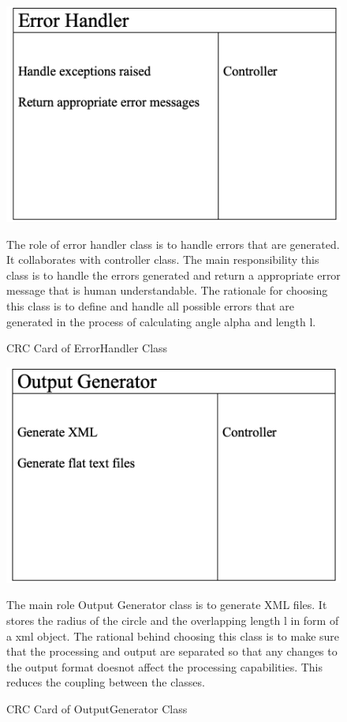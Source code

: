   \begin{figure}
    \centering
    \includegraphics[width=.5\linewidth]{resources/ErrorHandler.png}
    \caption{CRC Card of ErrorHandler Class}\label{fig:error}

    \parbox{1.0\linewidth}{
      The role of error handler class is to handle errors that are generated. It collaborates with controller class. The main responsibility this class is to handle the errors generated and return a appropriate error message that is human understandable. The rationale for choosing this class is to define and handle all possible errors that are generated in the process of calculating angle alpha and length l.
      }

  \end{figure}
  \begin{figure}[h]
    \centering
    \includegraphics[width=.5\linewidth]{resources/OutputGenerator.png}
    \caption{CRC Card of OutputGenerator Class}\label{fig:output}
    \parbox{1.0\linewidth}{
      The main role Output Generator class is to generate XML files. It stores the radius of the circle and the overlapping length l in form of a xml object. The rational behind choosing this class is to make sure that the processing and output are separated so that any changes to the output format doesnot affect the processing capabilities. This reduces the coupling between the classes.
      }

  \end{figure}
 
